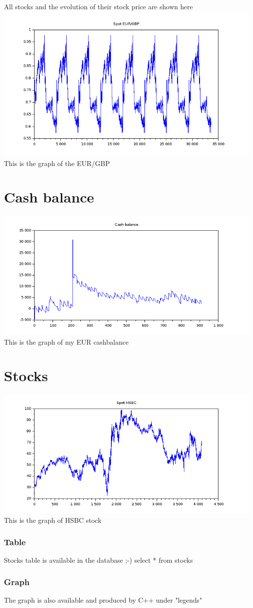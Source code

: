 \documentclass[8pt]{article} %
\begin{document}
All stocks and the evolution of their stock price are shown here\\
\includegraphics[scale=0.6]{Scilab-currencies.png}
This is the graph of the EUR/GBP 

\section{Cash balance}
\includegraphics[scale=0.6]{Scilab-cashBalance.png}
This is the graph of my EUR cashbalance 

\section{Stocks}
\includegraphics[scale=0.6]{Scilab-stocks.png}
This is the graph of HSBC stock 

\subsubsection{Table}
Stocks table is available in the database ;-)
select * from stocks
%
\subsubsection{Graph}
The graph is also available and produced by C++ under "legends"
%
%
\end{document}

